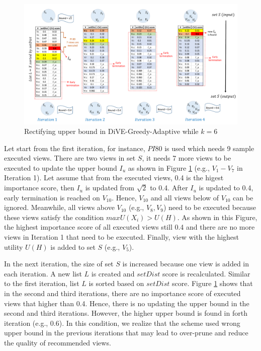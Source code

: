 \documentclass{article}
\begin{document}
\begin{figure}
	\begin{center}
		\includegraphics[width=7.0in]{figures/Rectifying_flow_column}
		\vspace{-8pt}
		\caption{Rectifying upper bound in DiVE-Greedy-Adaptive while $k = 6$}
		\label{fig:rectify_logic_column}
		
	\end{center}
\end{figure}
Let start from the first iteration, for instance, $PI80$ is used which needs 9 sample executed views. There are two views in set $S$, it needs 7 more views to be executed to update the upper bound $I_u$ as shown in Figure \ref{fig:rectify_logic_column} (e.g., $V_1 - V_7$ in Iteration 1). Let assume that from the executed views, 0.4 is the higest importance score, then $I_u$ is updated from $\sqrt{2}$ to 0.4. After $I_u$ is updated to 0.4, early termination is reached on $V_{10}$. Hence, $V_{10}$ and all views below of $V_{10}$ can be ignored. Meanwhile, all views above $V_{10}$ (e.g., $V_8, V_9$) need to be executed because these views satisfy the condition $maxU(X_i) > U(H)$. As shown in this Figure, the highest importance score of all executed views still 0.4 and there are no more views in Iteration 1 that need to be executed. Finally, view with the highest utility $U(H)$ is added to set $S$ (e.g., $V_5$). 

In the next iteration, the size of set $S$ is increased because one view is added in each iteration. A new list $L$ is created and $setDist$ score is recalculated. Similar to the first iteration, list $L$ is sorted based on $setDist$ score. 
Figure \ref{fig:rectify_logic_column} shows that in the second and third iterations, there are no importance score of executed views that higher than 0.4. Hence, there is no updating the upper bound in the second and third iterations. However, the higher upper bound is found in forth iteration (e.g., 0.6). In this condition, we realize that the scheme used wrong upper bound in the previous iterations that may lead to over-prune and reduce the quality of recommended views. 
\end{document}
